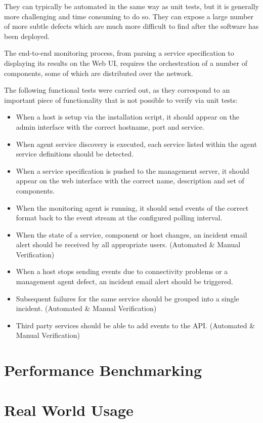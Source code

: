 \documentclass{cshonours}
\begin{document}
They can typically be automated in the same way as unit tests, but it is generally more challenging and time consuming to do so. They can expose a large number of more subtle defects which are much more difficult to find after the software has been deployed.

The end-to-end monitoring process, from parsing a service specification to displaying its results on the Web UI, requires the orchestration of a number of components, some of which are distributed over the network.

The following functional tests were carried out, as they correspond to an important piece of functionality that is not possible to verify via unit tests:

\begin{itemize}
  \item When a host is setup via the installation script, it should appear on the admin interface with the correct hostname, port and service.
  \item When agent service discovery is executed, each service listed within the agent service definitions should be detected.
  \item When a service specification is pushed to the management server, it should appear on the web interface with the correct name, description and set of components.
  \item When the monitoring agent is running, it should send events of the correct format back to the event stream at the configured polling interval.
  \item When the state of a service, component or host changes, an incident email alert should be received by all appropriate users. (Automated \& Manual Verification)
  \item When a host stops sending events due to connectivity problems or a management agent defect, an incident email alert should be triggered.
  \item Subsequent failures for the same service should be grouped into a single incident. (Automated \& Manual Verification)
  \item Third party services should be able to add events to the API. (Automated \& Manual Verification)
\end{itemize}

\section{Performance Benchmarking}
\section{Real World Usage}
\end{document}
